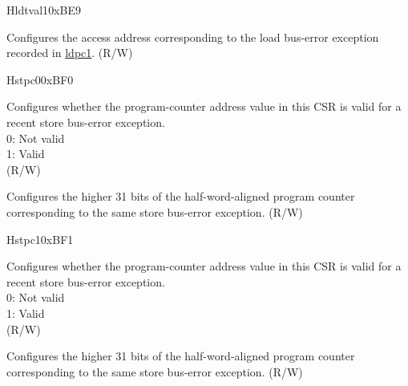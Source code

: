 \begin{register}{H}{ldtval1}{0xBE9}\label{regdesc:LDTVAL1}%
%
\regnewline%
\begin{regdesc}\begin{reglist}
\label{fielddesc:LDTVAL1_ADDR}\item [ADDR] Configures the access address corresponding to the load bus-error exception recorded in \hyperref[regdesc:LDPC1]{ldpc1}. (R/W)
\end{reglist}\end{regdesc}
\end{register}

\begin{register}{H}{stpc0}{0xBF0}\label{regdesc:STPC0}%
%
%
\regnewline%
\begin{regdesc}\begin{reglist}
\label{fielddesc:STPC0_VLD}\item [VLD] Configures whether the program-counter address value in this CSR is valid for a recent store bus-error exception.\\
0: Not valid\\
1: Valid\\
(R/W)
\label{fielddesc:STPC0_ADDR}\item [ADDR] Configures the higher 31 bits of the half-word-aligned program counter corresponding to the same store bus-error exception. (R/W)
\end{reglist}\end{regdesc}
\end{register}

\begin{register}{H}{stpc1}{0xBF1}\label{regdesc:STPC1}%
%
%
\regnewline%
\begin{regdesc}\begin{reglist}
\label{fielddesc:STPC1_VLD}\item [VLD] Configures whether the program-counter address value in this CSR is valid for a recent store bus-error exception. \\
0: Not valid\\
1: Valid\\
(R/W)
\label{fielddesc:STPC1_ADDR}\item [ADDR] Configures the higher 31 bits of the half-word-aligned program counter corresponding to the same store bus-error exception. (R/W)
\end{reglist}\end{regdesc}
\end{register}

